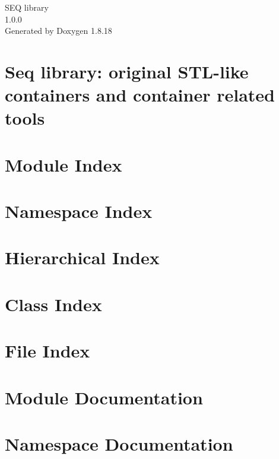 \let\mypdfximage\pdfximage\def\pdfximage{\immediate\mypdfximage}\documentclass[twoside]{book}
\newcommand{\+}{\discretionary{\mbox{\scriptsize$\hookleftarrow$}}{}{}}
\newcommand{\clearemptydoublepage}{%
  \newpage{\pagestyle{empty}\cleardoublepage}%
}
\begin{document}
\hypersetup{pageanchor=false,
             bookmarksnumbered=true,
             pdfencoding=unicode
            }
\begin{titlepage}
\vspace*{7cm}
\begin{center}%
{\Large S\+EQ library \\[1ex]\large 1.\+0.\+0 }\\
\vspace*{1cm}
{\large Generated by Doxygen 1.8.18}\\
\end{center}
\end{titlepage}
\clearemptydoublepage
{}
\tableofcontents
\clearemptydoublepage
{}
\hypersetup{pageanchor=true}

\chapter{Seq library\+: original S\+T\+L-\/like containers and container related tools}
\label{index}\hypertarget{index}{}
\chapter{Module Index}

\chapter{Namespace Index}

\chapter{Hierarchical Index}

\chapter{Class Index}

\chapter{File Index}

\chapter{Module Documentation}








\chapter{Namespace Documentation}





\end{document}
